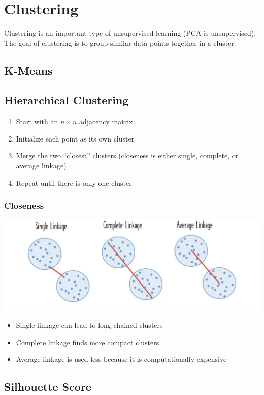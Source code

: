\documentclass[10pt]{report}
\begin{document}
\chapter{Clustering}
Clustering is an important type of unsupervised learning (PCA is unsupervised). The goal of clustering is to group similar data points together in a cluster.

\section{K-Means}
\section{Hierarchical Clustering}
\begin{enumerate}
  \item Start with an $n \times n$ adjacency matrix
  \item Initialize each point as its own cluster
  \item Merge the two ``closest'' clusters (closeness is either single, complete, or average linkage)
  \item Repeat until there is only one cluster
\end{enumerate}
\subsection{Closeness}
\includegraphics[width=\textwidth]{linkage.png}
\begin{itemize}
  \item Single linkage can lead to long chained clusters
  \item Complete linkage finds more compact clusters
  \item Average linkage is used less because it is computationally expensive
\end{itemize}
\section{Silhouette Score}
\end{document}
